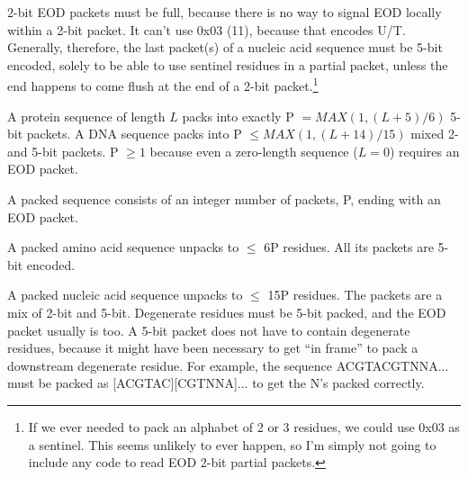 2-bit EOD packets must be full, because there is no way to signal EOD
locally within a 2-bit packet. It can't use 0x03 (11), because that
encodes U/T. Generally, therefore, the last packet(s) of a nucleic
acid sequence must be 5-bit encoded, solely to be able to use sentinel
residues in a partial packet, unless the end happens to come flush at
the end of a 2-bit packet.\footnote{If we ever needed to pack an
  alphabet of 2 or 3 residues, we could use 0x03 as a sentinel.  This
  seems unlikely to ever happen, so I'm simply not going to include
  any code to read EOD 2-bit partial packets.}

A protein sequence of length $L$ packs into exactly P $= MAX(1,
(L+5)/6)$ 5-bit packets. A DNA sequence packs into P $\leq MAX(1,
(L+14)/15)$ mixed 2- and 5-bit packets. P $\geq 1$ because even a
zero-length sequence ($L=0$) requires an EOD packet.

A packed sequence consists of an integer number of packets, P, ending
with an EOD packet.
 
A packed amino acid sequence unpacks to $\leq$ 6P residues. All its
packets are 5-bit encoded.
 
A packed nucleic acid sequence unpacks to $\leq$ 15P residues.  The
packets are a mix of 2-bit and 5-bit. Degenerate residues must be
5-bit packed, and the EOD packet usually is too. A 5-bit packet does
not have to contain degenerate residues, because it might have been
necessary to get ``in frame'' to pack a downstream degenerate
residue. For example, the sequence ACGTACGTNNA... must be packed as
[ACGTAC][CGTNNA]... to get the N's packed correctly.
 

